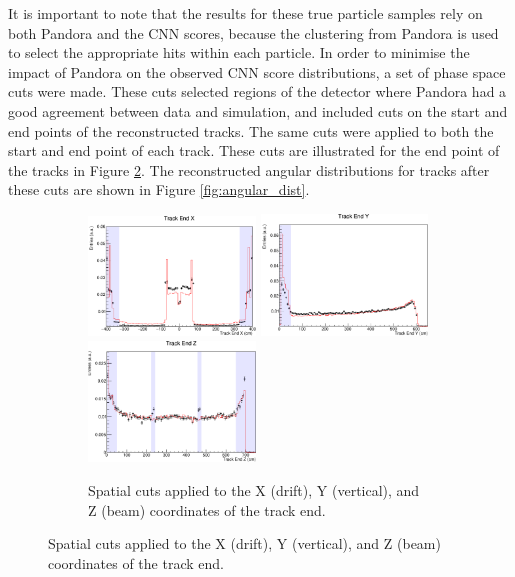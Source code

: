 It is important to note that the results for these true particle samples rely 
on both Pandora and the CNN scores, because the clustering from Pandora is 
used to select the appropriate hits within each particle. In order to minimise
the impact of Pandora on the observed CNN score distributions, a set of phase
space cuts were made. These cuts selected regions of the detector where 
Pandora had a good agreement between data and simulation, and included cuts on 
the start and end points of the reconstructed tracks. The same cuts were 
applied to both the start and end point of each track. These cuts are 
illustrated for the end point of the tracks in Figure \ref{fig:spatial_cuts}. 
The reconstructed angular distributions for tracks after these cuts are shown 
in Figure \ref{fig:angular_dist}.

\begin{figure}

	\begin{subfigure}[b]{\textwidth}
		\centering
		\includegraphics[width=0.488\textwidth]{figures/endX_nocuts.pdf}
		\hfill
		\includegraphics[width=0.488\textwidth]{figures/endY_nocuts.pdf}
		\includegraphics[width=0.488\textwidth]{figures/endZ_nocuts.pdf}
		\caption {Spatial cuts applied to the X (drift), Y (vertical), and Z (beam) 
		coordinates of the track end.}
		\label{fig:spatial_cuts}
	\end{subfigure}


\end{figure}
